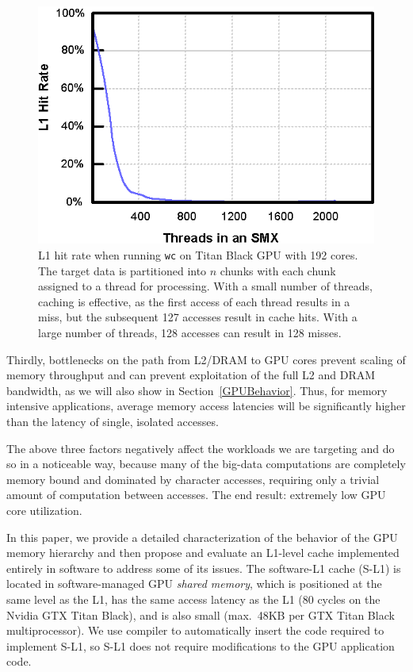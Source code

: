 \begin{figure}
\center
\includegraphics[scale=0.90]{WC-L1HitRate.eps}
\caption{\footnotesize\textnormal{L1 hit rate when running \texttt{wc} on Titan
Black GPU with 192 cores. The target data is partitioned into $n$ chunks with
each chunk assigned to a thread for processing. With a small number of threads, caching is effective, as the
first access of each thread results in a miss, but the subsequent 127 accesses
result in cache hits. With a large number of threads, 128 accesses can result in 128
misses.}} \label{fig:L1HitRate}
\vspace{-0.6cm}
\end{figure}

Thirdly, bottlenecks on the path from L2/DRAM to GPU cores prevent scaling of memory throughput and can prevent exploitation of the full L2 and DRAM bandwidth, as we will also show in Section~\ref{GPUBehavior}.
Thus, for memory intensive applications, average memory access latencies will be significantly higher than the latency of single, isolated accesses.

The above three factors negatively affect the workloads we are targeting and do so in a noticeable way,
because many of the big-data computations are completely memory bound and dominated by character accesses, requiring only a
trivial amount of computation between accesses.
The end result: extremely low GPU core utilization.

In this paper, we provide a detailed characterization of the behavior of the GPU memory hierarchy and then propose and evaluate
an L1-level cache implemented entirely in software to address some of its issues. %
The software-L1 cache (S-L1) is located in software-managed GPU \emph{shared memory},
which is positioned at the same level as the L1, has the same access latency as the L1  (80 cycles on the Nvidia GTX Titan Black), and is also small (max.\ 48KB per GTX Titan Black multiprocessor).
We use compiler to automatically insert the code required to implement S-L1, so S-L1 does not require modifications to the GPU application code.

